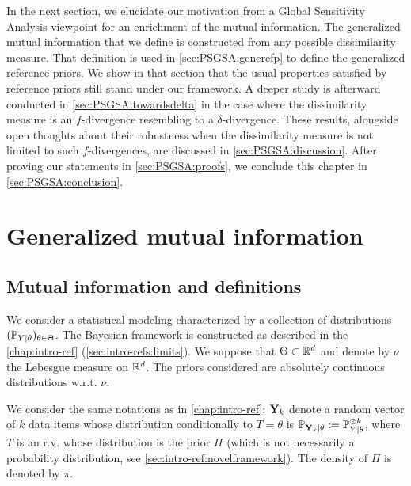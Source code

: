 In the next section, %
we elucidate our motivation 
from a Global Sensitivity Analysis viewpoint for an enrichment of the mutual information. 
The generalized mutual information that we define is constructed from any possible dissimilarity measure.
That definition is used in \cref{sec:PSGSA:generefp} to define the generalized reference priors. We show in that section that the usual properties satisfied by reference priors still stand under our framework.
A deeper study is afterward conducted in \cref{sec:PSGSA:towardsdelta} in the case where the dissimilarity measure is an $f$-divergence resembling to a $\delta$-divergence. 
These results, alongside open thoughts about their robustness when the dissimilarity measure is not limited to such $f$-divergences, are discussed in \cref{sec:PSGSA:discussion}.
After proving our statements in \cref{sec:PSGSA:proofs}, we conclude this chapter in \cref{sec:PSGSA:conclusion}.







\section{Generalized mutual information}\label{sec:PSGSA:genMI}

\subsection{Mutual information and definitions}


We consider a statistical modeling characterized by a collection of distributions $(\mathbb{P}_{Y|\theta})_{\theta\in\Theta}$. 
The Bayesian framework is constructed as described in the \cref{chap:intro-ref} (\cref{sec:intro-refs:limits}). We suppose that $\Theta\subset\mathbb{R}^d$ and denote by $\nu$ the Lebesgue measure on $\mathbb{R}^d$. 
The priors considered are absolutely continuous distributions w.r.t. $\nu$.

We consider the same notations as in \cref{chap:intro-ref}: $\mathbf{Y}_k$ denote a random vector of $k$ data items whose distribution conditionally to $T=\theta$ is $\mathbb{P}_{\mathbf{Y}_k|\theta}:=\mathbb{P}_{Y|\theta}^{\otimes k}$, where $T$ is an r.v. whose distribution is the prior $\varPi$ (which is not necessarily a probability distribution, see \cref{sec:intro-ref:novelframework}). The density of $\varPi$ is denoted by $\pi$.

